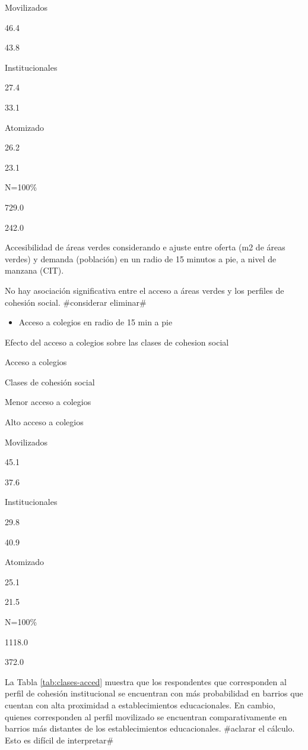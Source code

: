 \documentclass[
  12pt,
]{book}
\providecommand{\tightlist}{%
  \setlength{\itemsep}{0pt}\setlength{\parskip}{0pt}}
\begin{document}
Movilizados

46.4

43.8

Institucionales

27.4

33.1

Atomizado

26.2

23.1

N=100\%

729.0

242.0

Accesibilidad de áreas verdes considerando e ajuste entre oferta (m2 de áreas verdes) y demanda (población) en un radio de 15 minutos a pie, a nivel de manzana (CIT).

No hay asociación significativa entre el acceso a áreas verdes y los perfiles de cohesión social. \#considerar eliminar\#

\begin{itemize}
\tightlist
\item
  Acceso a colegios en radio de 15 min a pie
\end{itemize}

\label{tab:clases-acced}Efecto del acceso a colegios sobre las clases de cohesion social

Acceso a colegios

Clases de cohesión social

Menor acceso a colegios

Alto acceso a colegios

Movilizados

45.1

37.6

Institucionales

29.8

40.9

Atomizado

25.1

21.5

N=100\%

1118.0

372.0

La Tabla \ref{tab:clases-acced} muestra que los respondentes que corresponden al perfil de cohesión institucional se encuentran con más probabilidad en barrios que cuentan con alta proximidad a establecimientos educacionales. En cambio, quienes corresponden al perfil movilizado se encuentran comparativamente en barrios más distantes de los establecimientos educacionales. \#aclarar el cálculo. Esto es difícil de interpretar\#
\end{document}
